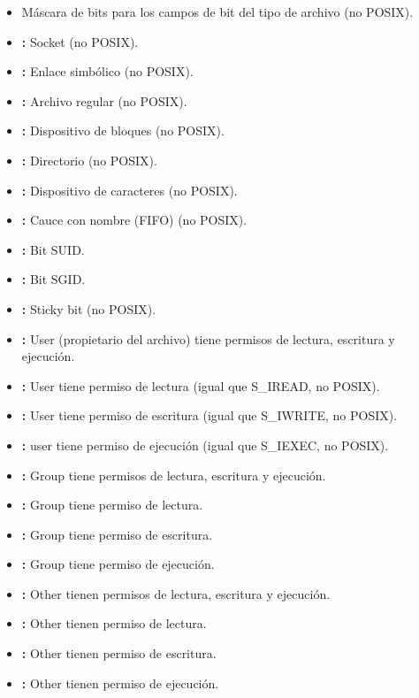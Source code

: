 \begin{itemize}
	\item{} Máscara de bits para los campos de bit del tipo de archivo (no POSIX).
	\item{}\textbf{:} Socket (no POSIX).
	\item{}\textbf{:} Enlace simbólico (no POSIX).
	\item{}\textbf{:} Archivo regular (no POSIX).
	\item{}\textbf{:} Dispositivo de bloques (no POSIX).
	\item{}\textbf{:} Directorio (no POSIX).
	\item{}\textbf{:} Dispositivo de caracteres (no POSIX).
	\item{}\textbf{:} Cauce con nombre (FIFO) (no POSIX).
	\item{}\textbf{:} Bit SUID\@.
	\item{}\textbf{:} Bit SGID\@.
	\item{}\textbf{:} Sticky bit (no POSIX).
	\item{}\textbf{:} User (propietario del archivo) tiene permisos de lectura, escritura y  ejecución.
	\item{}\textbf{:} User tiene permiso de lectura (igual que S\_IREAD, no POSIX).
	\item{}\textbf{:} User tiene permiso de escritura (igual que S\_IWRITE, no POSIX).
	\item{}\textbf{:} user tiene permiso de ejecución (igual que S\_IEXEC, no POSIX).
	\item{}\textbf{:} Group tiene permisos de lectura, escritura y ejecución.
	\item{}\textbf{:} Group tiene permiso de lectura.
	\item{}\textbf{:} Group tiene permiso de escritura.
	\item{}\textbf{:} Group tiene permiso de ejecución.
	\item{}\textbf{:} Other tienen permisos de lectura, escritura y ejecución.
	\item{}\textbf{:} Other tienen permiso de lectura.
	\item{}\textbf{:} Other tienen permiso de escritura.
	\item{}\textbf{:} Other tienen permiso de ejecución.
\end{itemize}

